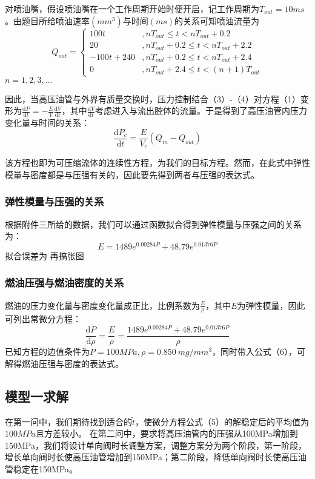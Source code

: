 \documentclass[withoutpreface,bwprint]{cumcmthesis} %
\begin{document}
	对喷油嘴，假设喷油嘴在一个工作周期开始时便开启，记工作周期为$T_{out} = 10 ms$。由题目所给喷油速率$(mm^3)$与时间$(ms)$的关系可知喷油流量为
	\begin{equation}
	Q_{out} = \left\{ 
	\begin{array}{ll}
	100t&,nT_{out}\leq t<nT_{out}+0.2 \\
	20&,nT_{out}+0.2\leq t< nT_{out}+2.2\\
	-100t+240&,nT_{out}+0.2\leq t< nT_{out}+2.4\\
	0&,nT_{out}+2.4\leq t <(n+1)T_{out}
	\end{array}
	\right.
	\end{equation}
	$n = 1,2,3,...$
	
	因此，当高压油管与外界有质量交换时，压力控制结合（3）-（4）对方程（1）变形为$\frac{\mathrm{d}P}{\mathrm{d}t}=-\frac{E}{V}\frac{\mathrm{d}V}{\mathrm{d}t}$，其中$\frac{\mathrm{d}V}{\mathrm{d}t}$考虑进入与流出腔体的流量。于是得到了高压油管内压力变化量与时间的关系：
			\begin{equation}
			\frac{\mathrm{d}P_c}{\mathrm{d}t} = \frac{E}{V_c}(Q_{in} - Q_{out})
			\end{equation}
			
			该方程也即为可压缩流体的连续性方程，为我们的目标方程。然而，在此式中弹性模量与密度都是与压强有关的，因此要先得到两者与压强的表达式。
			\subsubsection{弹性模量与压强的关系}
			根据附件三所给的数据，我们可以通过函数拟合得到弹性模量与压强之间的关系为：
			\begin{equation}
			E = 1489 e^{0.00284P} + 48.79 e^{0.01376 P}
			\end{equation}
			拟合误差为 再搞张图
			
			
			\subsubsection{燃油压强与燃油密度的关系}
			燃油的压力变化量与密度变化量成正比，比例系数为$\frac{E}{\rho}$，其中$E$为弹性模量，因此可列出常微分方程：
			\begin{equation}
			\frac{\mathrm{d}P}{\mathrm{d}\rho} = \frac{E}{\rho} = \frac{1489 e^{0.00284P} + 48.79 e^{0.01376 P}}{\rho}
			\end{equation}
			已知方程的边值条件为$P = 100MPa, \rho = 0.850\ mg/mm^3$，同时带入公式（6），可解得燃油压强与密度的表达式。
			\subsection{模型一求解}
			在第一问中，我们期待找到适合的$\widetilde{t}$，使微分方程公式（5）的解稳定后的平均值为100$MPa$且方差较小。
			在第二问中，要求将高压油管内的压强从100MPa增加到150MPa，我们将设计单向阀时长调整方案，调整方案分为两个阶段，第一阶段，增长单向阀时长使高压油管增加到150MPa；第二阶段，降低单向阀时长使高压油管稳定在150MPa。
\end{document}
